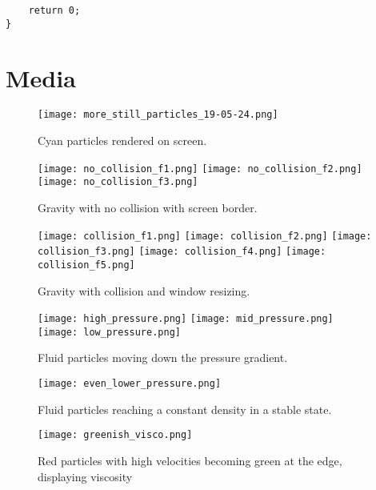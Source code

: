 \documentclass[write-up.tex]{subfiles}
\begin{document}
\begin{appendices}
\begin{lstlisting}
    return 0;
}
\end{lstlisting}

\pagebreak

\section{Media}
\label{appendix:a}
\begin{figure}[h]
\centering
\texttt{[image: more\_still\_particles\_19-05-24.png]}
\caption{Cyan particles rendered on screen.}
\label{fig:cyan}
\end{figure}

\begin{figure}[h]
\centering
\texttt{[image: no\_collision\_f1.png]}
\texttt{[image: no\_collision\_f2.png]}
\texttt{[image: no\_collision\_f3.png]}
\caption{Gravity with no collision with screen border.}
\label{fig:nograv}
\end{figure}

\begin{figure}[h]
\centering
\texttt{[image: collision\_f1.png]}
\texttt{[image: collision\_f2.png]}
\texttt{[image: collision\_f3.png]}
\texttt{[image: collision\_f4.png]}
\texttt{[image: collision\_f5.png]}
\caption{Gravity with collision and window resizing.}
\label{fig:grav}
\end{figure}

\begin{figure}[h]
\centering
\texttt{[image: high\_pressure.png]}
\texttt{[image: mid\_pressure.png]}
\texttt{[image: low\_pressure.png]}
\caption{Fluid particles moving down the pressure gradient.}
\label{fig:pressure_grad}
\end{figure}

\begin{figure}[h]
\centering
\texttt{[image: even\_lower\_pressure.png]}
\caption{Fluid particles reaching a constant density in a stable state.}
\label{fig:constant_density}
\end{figure}

\begin{figure}[h]
\centering
\texttt{[image: greenish\_visco.png]}
\caption{Red particles with high velocities becoming green at the edge, displaying viscosity}
\label{fig:viscosity}
\end{figure}


\end{appendices}
\end{document}
